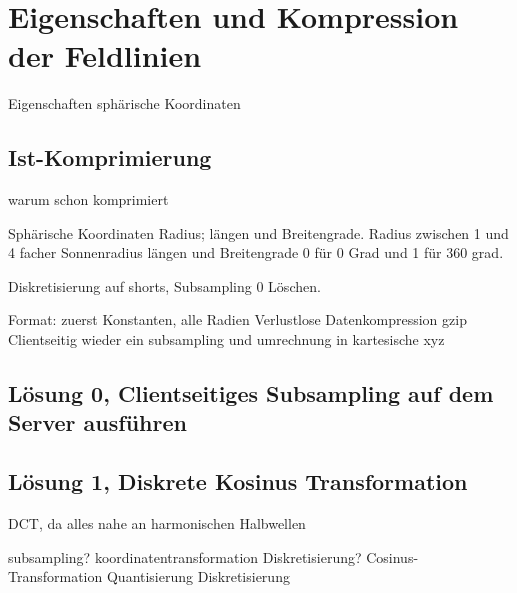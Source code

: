 \section{Eigenschaften und Kompression der Feldlinien}
Eigenschaften
sphärische Koordinaten

\subsection{Ist-Komprimierung} \label{konzept:ist-komprimierung}
warum schon komprimiert

Sphärische Koordinaten Radius; längen und Breitengrade.
Radius zwischen 1 und 4 facher Sonnenradius
längen und Breitengrade 0 für 0 Grad und 1 für 360 grad.

Diskretisierung auf shorts, 
Subsampling
0 Löschen.

Format: zuerst Konstanten, alle Radien
Verlustlose Datenkompression gzip
Clientseitig wieder ein subsampling und umrechnung in kartesische xyz

	
\subsection{Lösung 0, Clientseitiges Subsampling auf dem Server ausführen}

\subsection{Lösung 1, Diskrete Kosinus Transformation}
DCT, da alles nahe an harmonischen Halbwellen

subsampling?
koordinatentransformation
Diskretisierung?
Cosinus-Transformation
Quantisierung
Diskretisierung


